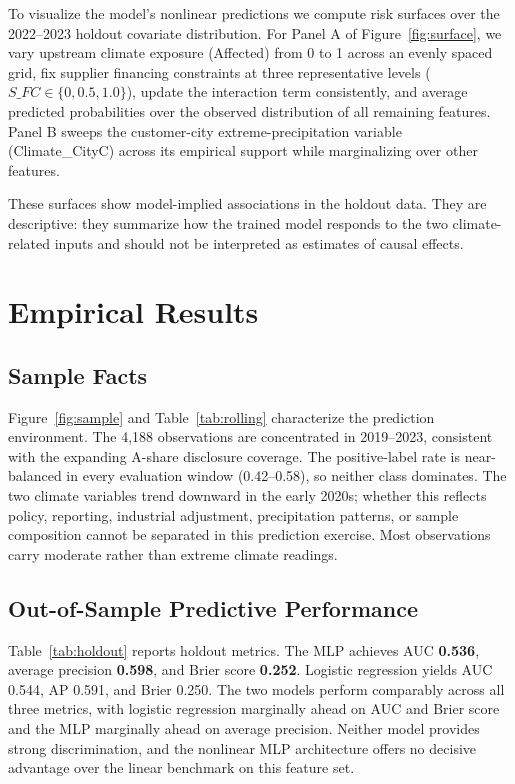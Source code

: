 \documentclass[12pt]{article}
\begin{document}
To visualize the model's nonlinear predictions we compute risk surfaces
over the 2022--2023 holdout covariate distribution.  For Panel A of
Figure~\ref{fig:surface}, we vary upstream climate exposure (Affected)
from 0 to 1 across an evenly spaced grid, fix supplier financing
constraints at three representative levels
($\textit{S\_FC} \in \{0, 0.5, 1.0\}$), update the interaction term
consistently, and average predicted probabilities over the observed
distribution of all remaining features.  Panel B sweeps the
customer-city extreme-precipitation variable (Climate\_CityC) across
its empirical support while marginalizing over other features.

These surfaces show model-implied associations in the holdout data.
They are descriptive: they summarize how the trained model responds to
the two climate-related inputs and should not be interpreted as
estimates of causal effects.

\section{Empirical Results}\label{sec:results}

\subsection{Sample Facts}

Figure~\ref{fig:sample} and Table~\ref{tab:rolling} characterize the
prediction environment.  The 4,188 observations are concentrated in
2019--2023, consistent with the expanding A-share disclosure coverage.
The positive-label rate is near-balanced in every evaluation window
(0.42--0.58), so neither class dominates.  The two climate variables trend
downward in the early 2020s; whether this reflects policy, reporting,
industrial adjustment, precipitation patterns, or sample composition cannot
be separated in this prediction exercise.  Most observations carry moderate
rather than extreme climate readings.

\subsection{Out-of-Sample Predictive Performance}

Table~\ref{tab:holdout} reports holdout metrics.  The MLP achieves AUC
\textbf{0.536}, average precision \textbf{0.598}, and Brier score
\textbf{0.252}.  Logistic regression yields AUC 0.544, AP 0.591, and Brier
0.250.  The two models perform comparably across all three metrics, with
logistic regression marginally ahead on AUC and Brier score and the MLP
marginally ahead on average precision.  Neither model provides strong
discrimination, and the nonlinear MLP architecture offers no decisive
advantage over the linear benchmark on this feature set.
\end{document}
